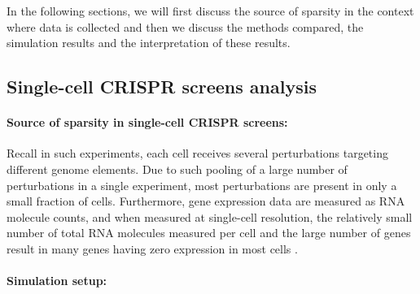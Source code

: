 \documentclass[12pt]{article}
\theoremstyle{definition}
\begin{document}
In the following sections, we will first discuss the source of sparsity in the context where data is collected and then we discuss the methods compared, the simulation results and the interpretation of these results. 

\subsection{Single-cell CRISPR screens analysis}\label{sec:CRISPR-screens}

\paragraph{Source of sparsity in single-cell CRISPR screens:}
Recall in such experiments, each cell receives several perturbations targeting different genome elements. Due to such pooling of a large number of perturbations in a single experiment, most perturbations are present in only a small fraction of cells. Furthermore, gene expression data are measured as RNA molecule counts, and when measured at single-cell resolution, the relatively small number of total RNA molecules measured per cell and the large number of genes result in many genes having zero expression in most cells \citep{Svensson2020}.

\paragraph{Simulation setup:}
\end{document}
